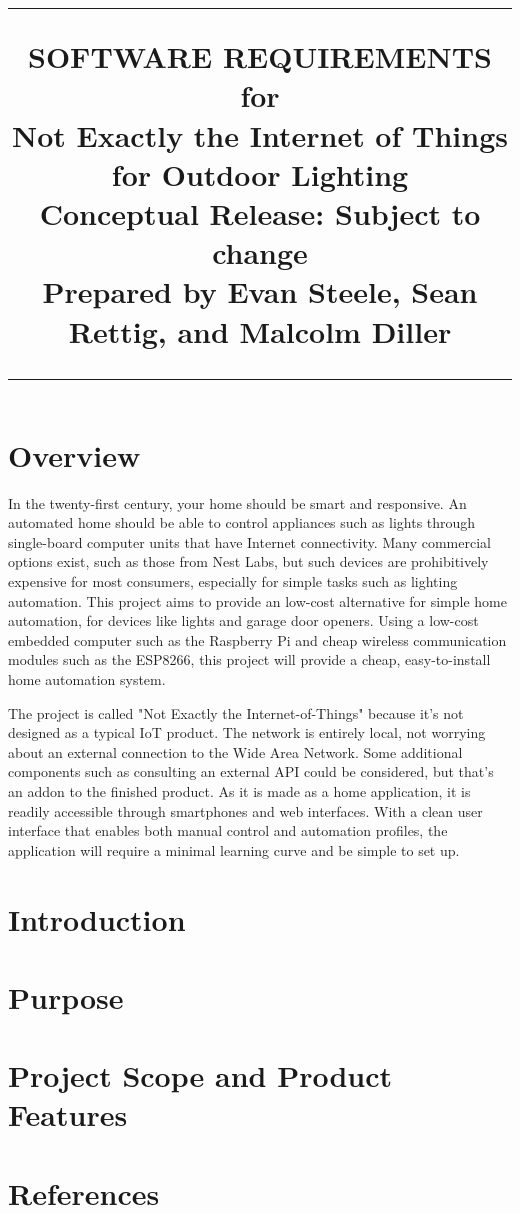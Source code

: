 \documentclass[oneside,openright]{scrreprt}
\title{
	\flushright
		\rule{16cm}{5pt}\vskip1cm
		\Huge{SOFTWARE REQUIREMENTS}\\
		\vspace{2cm}
	for\\
		\vspace{2cm}
	Not Exactly the Internet of Things for Outdoor Lighting\\
		\vspace{2cm}
	\LARGE{Conceptual Release:}
	\vspace{2cm}
	\LARGE{Subject to change\\}
	\vspace{2cm}
	Prepared by Evan Steele, Sean Rettig, and Malcolm Diller\\
		\vfill
		\rule{16cm}{5pt}
}
\date{}
\begin{document}
\maketitle
\tableofcontents
\newpage

\section{Overview}

In the twenty-first century, your home should be smart and responsive. An
automated home should be able to control appliances such as lights through
single-board computer units that have Internet connectivity. Many commercial
options exist, such as those from Nest Labs, but such devices are prohibitively
expensive for most consumers, especially for simple tasks such as lighting
automation. This project aims to provide an low-cost alternative for simple
home automation, for devices like lights and garage door openers. Using a
low-cost embedded computer such as the Raspberry Pi and cheap wireless
communication modules such as the ESP8266, this project will provide a cheap,
easy-to-install home automation system.

The project is called "Not Exactly the Internet-of-Things" because it's not
designed as a typical IoT product. The network is entirely local, not worrying
about an external connection to the Wide Area Network. Some additional
components such as consulting an external API could be considered, but that's
an addon to the finished product. As it is made as a home application, it
is readily accessible through smartphones and web interfaces. With a clean user
interface that enables both manual control and automation profiles, the
application will require a minimal learning curve and be simple to set up.  

\section{Introduction}

\section{Purpose}

\section{Project Scope and Product Features}

\section{References}
\end{document}

